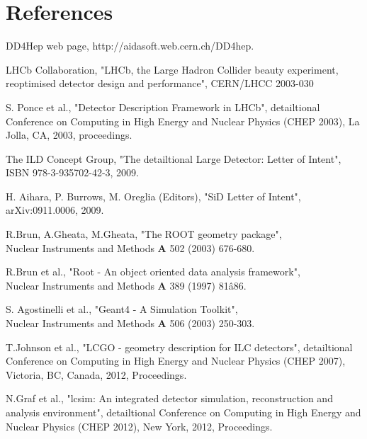 \documentclass[a4paper]{jpconf}
\begin{document}
\section*{References}
\begin{thebibliography}{9}

  DD4Hep web page, http://aidasoft.web.cern.ch/DD4hep.

 		LHCb Collaboration, 
                "LHCb, the Large Hadron Collider beauty experiment, reoptimised detector 
				design and performance", CERN/LHCC 2003-030

 S. Ponce et al., 
                "Detector Description Framework in LHCb", 
                detailtional Conference on Computing in High Energy and Nuclear Physics  (CHEP 2003), 
                La Jolla, CA, 2003, proceedings. 

  The ILD Concept Group, 
                   "The detailtional Large Detector: Letter of Intent",\\
                   ISBN 978-3-935702-42-3, 2009.

  H. Aihara, P. Burrows, M. Oreglia (Editors),
                   "SiD Letter of Intent",
                   arXiv:0911.0006, 2009.

 R.Brun, A.Gheata, M.Gheata, "The ROOT geometry package",\\
                    Nuclear Instruments and Methods {\bf{A}} 502 (2003) 676-680.

 R.Brun et al., 
                   "Root - An object oriented data analysis framework",\\
                    Nuclear Instruments and Methods {\bf{A}} 389 (1997) 81â86.

  S. Agostinelli et al., 
                   "Geant4 - A Simulation Toolkit", \\
                    Nuclear Instruments and Methods {\bf{A}} 506 (2003) 250-303.

 T.Johnson et al., 
                   "LCGO - geometry description for ILC detectors", 
                   detailtional Conference on Computing in High Energy and Nuclear Physics  (CHEP 2007), 
                   Victoria, BC, Canada, 2012, Proceedings.

 N.Graf et al., 
                   "lcsim: An integrated detector simulation, 
                   reconstruction and analysis environment", 
                   detailtional Conference on Computing in High Energy and Nuclear Physics (CHEP 2012),
                   New York, 2012, Proceedings.


\end{thebibliography}
\end{document}
